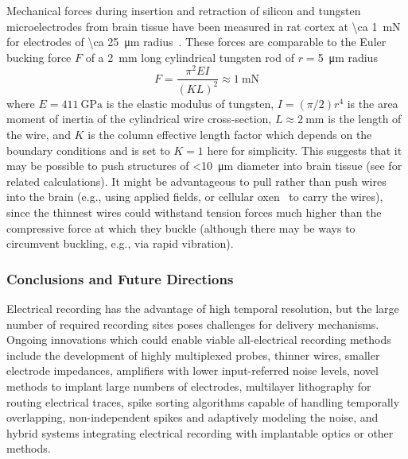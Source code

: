 Mechanical forces during insertion and retraction of silicon and tungsten microelectrodes from brain tissue have been measured in rat cortex at \SI{\ca 1}{\milli\newton} for electrodes of \SI{\ca 25}{\micro\meter} radius~\cite{jensen03}.
These forces are comparable to the Euler bucking force $F$ of a \SI{2}{\milli\meter} long cylindrical tungsten rod of $r=$\SI{5}{\micro\meter} radius
\[F=\frac{\pi^2 E I}{(K L)^2} \approx \SI{1}{\milli\newton}\]
where $E=\SI{411}{\giga\pascal}$ is the elastic modulus of tungsten, $I=(\pi/2)r^4$ is the area moment of inertia of the cylindrical wire cross-section, $L\approx\SI{2}{\milli\meter}$ is the length of the wire, and $K$ is the column effective length factor which depends on the boundary conditions and is set to $K=1$ here for simplicity.
This suggests that it may be possible to push structures of \SI{<10}{\micro\meter} diameter into brain tissue (see \cite{najafi90} for related calculations). It might be advantageous to pull rather than push wires into the brain (e.g., using applied fields, or cellular oxen~\cite{Weibel23082005} to carry the wires), since the thinnest wires could withstand tension forces much higher than the compressive force at which they buckle (although there may be ways to circumvent buckling, e.g., via rapid vibration).

\subsubsection{Conclusions and Future Directions}

Electrical recording has the advantage of high temporal resolution, but the large number of required recording sites poses challenges for delivery mechanisms.
Ongoing innovations which could enable viable all-electrical recording methods include
the development of highly multiplexed probes, thinner wires, smaller electrode impedances,
amplifiers with lower input-referred noise levels, novel methods to implant large numbers of electrodes,
multilayer lithography for routing electrical traces, spike sorting algorithms capable of handling temporally overlapping, non-independent spikes and adaptively modeling the noise, and hybrid systems integrating electrical recording with
implantable optics or other methods.

